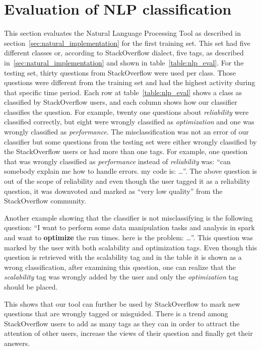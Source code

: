 \section{Evaluation of NLP classification}
\label{sec:nlp_evaluation}
This section evaluates the Natural Language Processing Tool as described in section~\ref{sec:natural_implementation} for the first training set. This set had five different classes or, according to StackOverflow dialect, five tags, as described in~\ref{sec:natural_implementation} and shown in table~\ref{table:nlp_eval}. For the testing set, thirty questions from StackOverflow were used per class. Those questions were different from the training set and had the highest activity during that specific time period. Each row at table~\ref{table:nlp_eval} shows a class as classified by StackOverflow users, and each column shows how our classifier classifies the question. For example, twenty one questions about \emph{reliability} were classified correctly, but eight were wrongly classified as \emph{optimization} and one was wrongly classified as \emph{performance}. The misclassification was not an error of our classifier but some questions from the testing set were either wrongly classified by the StackOverflow users or had more than one tags. For example, one question that was wrongly classified as \emph{performance} instead of \emph{reliability} was: ``can somebody explain me how to handle errors. my code is: \ldots''. The above question is out of the scope of reliability and even though the user tagged it as a reliability question, it was downvoted and marked as ``very low quality'' from the StackOverflow community.

Another example showing that the classifier is not misclassifying is the following question:
``I want to perform some data manipulation tasks and analysis in spark and want to \textbf{optimize} the run times. 
here is the problem: \ldots ''. 
This question was marked by the user with both scalability and optimization tags. Even though this question is retrieved with the scalability tag and in the table it is shown as a wrong classification, after examining this question, one can realize that the \emph{scalability} tag was wrongly added by the user and only the \emph{optimization} tag should be placed.

This shows that our tool can further be used by StackOverflow to mark new questions that are wrongly tagged or misguided. There is a trend among StackOverflow users to add as many tags as they can in order to attract the attention of other users, increase the views of their question and finally get their answers.  

